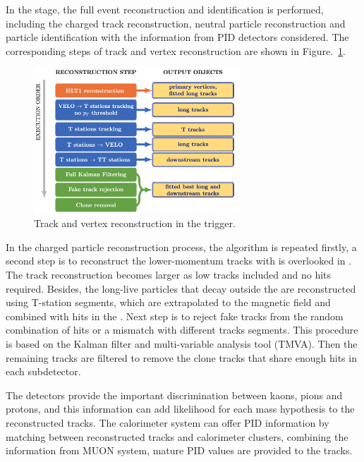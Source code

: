 In the \hlttwo stage,
the full event reconstruction and identification is performed,
including the charged track reconstruction,
neutral particle reconstruction and particle identification with the information from PID detectors considered.
The corresponding steps of track and vertex reconstruction are shown in Figure.~\ref{fig:Hlttwo}.

\begin{figure}[!hbtp]
\centering
\includegraphics[width=0.69\textwidth]{Figures/02_Detector/Hlttwo}%
\caption{Track and vertex reconstruction in the \hlttwo trigger\supercite{Aaij_2019}.}
\label{fig:Hlttwo}
\end{figure}

In the charged particle reconstruction process,
the \hltone algorithm is repeated firstly,
a second step is to reconstruct the lower-momentum tracks with is overlooked in \hltone.
The track reconstruction becomes larger as low \pt tracks included and no \ttracker hits required.
Besides,
the long-live particles that decay outside the \velo are reconstructed using T-station segments,
which are extrapolated to the magnetic field and combined with hits in the \ttracker.
Next step is to reject fake tracks from the random combination of hits or a mismatch with different tracks segments.
This procedure is based on the Kalman filter and multi-variable analysis tool (TMVA).
Then the remaining tracks are filtered to remove the clone tracks that share enough hits in each subdetector.

The \rich detectors provide the important discrimination between kaons, pions and protons,
and this information can add likelihood for each mass hypothesis to the reconstructed tracks.
The calorimeter system can offer PID information by matching between reconstructed tracks and calorimeter clusters,
combining the information from MUON system,
mature PID values are provided to the tracks.


